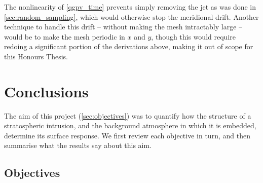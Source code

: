 \documentclass{article}
\begin{document}
The nonlinearity of \cref{qgpv_time} prevents simply removing the jet as was done in \cref{sec:random_sampling}, which would otherwise stop the meridional drift.
Another technique to handle this drift -- without making the mesh intractably large -- would be to make the mesh periodic in $x$ and $y$, though this would require redoing a significant portion of the derivations above, making it out of scope for this Honours Thesis.

\section{Conclusions}

The aim of this project (\cref{sec:objectives}) was to quantify how the structure of a stratospheric intrusion, and the background atmosphere in which it is embedded, determine its surface response.
We first review each objective in turn, and then summarise what the results say about this aim.

\subsection{Objectives}
\end{document}
